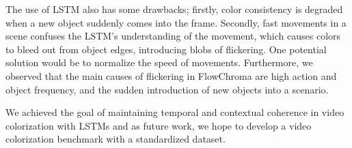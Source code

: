 \documentclass[10pt,twocolumn,letterpaper]{article}
\begin{document}
The use of LSTM also has some drawbacks; firstly, color consistency is degraded when a new object suddenly comes into the frame. Secondly, fast movements in a scene confuses the LSTM's understanding of the movement, which causes colors to bleed out from object edges, introducing blobs of flickering. One potential solution would be to normalize the speed of movements. Furthermore, we observed that the main causes of flickering in FlowChroma are high action and object frequency, and the sudden introduction of new objects into a scenario. 

We achieved the goal of maintaining temporal and contextual coherence in video colorization with LSTMs and as future work, we hope to develop a video colorization benchmark with a standardized dataset.





{\small


}
\end{document}
